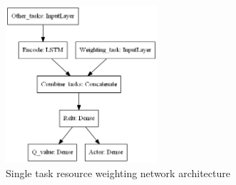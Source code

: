 \begin{figure}[h]
    \centering
    \includegraphics[width=0.5\textwidth]{figures/3_solution_figs/single_task_weighting_network_architecture.png}
    \caption{Single task resource weighting network architecture}
    \label{fig:resource_weighting_network_architecture}
\end{figure}


